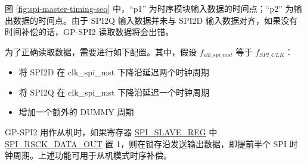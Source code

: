 \documentclass[main\_\_CN.tex]{subfiles}
\begin{document}
图 \ref{fig:spi-master-timing-seq} 中，``p1” 为时序模块输入数据的时间点；``p2” 为输出数据的时间点。由于 SPI2Q 输入数据并未与 SPI2D 输入数据对齐，如果没有时间补偿的话，GP-SPI2 读取数据将会出错。 

为了正确读取数据，需要进行如下配置。其中，假设 $f_{clk\_spi\_mst}$ 等于 $f_{SPI\_CLK}$：

\begin{itemize}
    \item 将 SPI2D 在 clk\_spi\_mst 下降沿延迟两个时钟周期
    \item 将 SPI2Q 在 clk\_spi\_mst 下降沿延迟一个时钟周期
    \item 增加一个额外的 DUMMY 周期
\end{itemize}


GP-SPI2 用作从机时，如果寄存器 \hyperref[regdesc:SPISLAVEREG]{SPI\_SLAVE\_REG} 中 \hyperref[fielddesc:SPIRSCKDATAOUT]{SPI\_RSCK\_DATA\_OUT} 置 1，则在锁存沿发送输出数据，即提前半个 SPI 时钟周期。上述功能可用于从机模式时序补偿。
\end{document}
